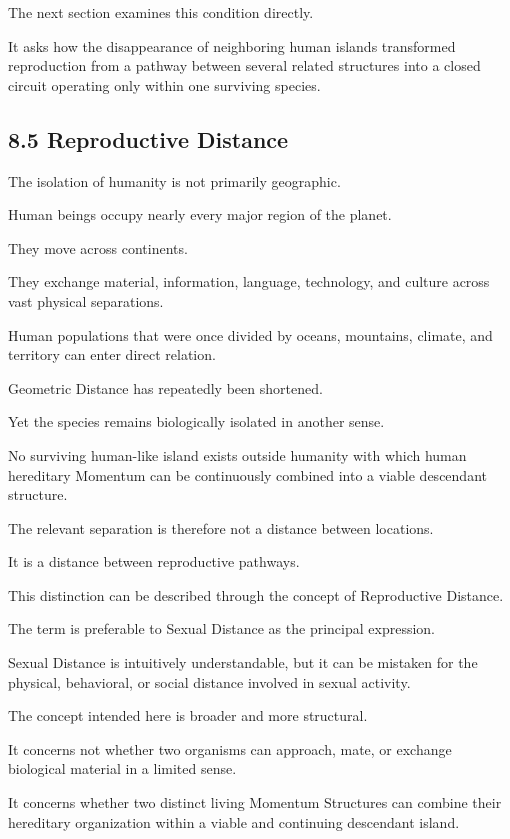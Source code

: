 The next section examines this condition directly.

It asks how the disappearance of neighboring human islands transformed reproduction from a pathway between several related structures into a closed circuit operating only within one surviving species.

\subsection*{\textbf{8.5 Reproductive Distance}}

The isolation of humanity is not primarily geographic.

Human beings occupy nearly every major region of the planet.

They move across continents.

They exchange material, information, language, technology, and culture across vast physical separations.

Human populations that were once divided by oceans, mountains, climate, and territory can enter direct relation.

Geometric Distance has repeatedly been shortened.

Yet the species remains biologically isolated in another sense.

No surviving human-like island exists outside humanity with which human hereditary Momentum can be continuously combined into a viable descendant structure.

The relevant separation is therefore not a distance between locations.

It is a distance between reproductive pathways.

This distinction can be described through the concept of Reproductive Distance.

The term is preferable to Sexual Distance as the principal expression.

Sexual Distance is intuitively understandable, but it can be mistaken for the physical, behavioral, or social distance involved in sexual activity.

The concept intended here is broader and more structural.

It concerns not whether two organisms can approach, mate, or exchange biological material in a limited sense.

It concerns whether two distinct living Momentum Structures can combine their hereditary organization within a viable and continuing descendant island.

